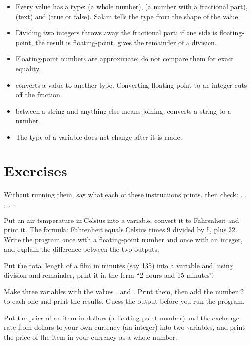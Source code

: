 \begin{summary}
\begin{itemize}
  \item Every value has a type:  (a whole number),  (a
        number with a fractional part),  (text) and 
        (true or false). Salam tells the type from the shape of the value.
  \item Dividing two integers throws away the fractional part; if one side
        is floating-point, the result is floating-point. \code{\%} gives
        the remainder of a division.
  \item Floating-point numbers are approximate; do not compare them for
        exact equality.
  \item {} converts a value to another type. Converting
        floating-point to an integer cuts off the fraction.
  \item \code{+} between a string and anything else means joining.
         converts a string to a number.
  \item The type of a variable does not change after it is made.
\end{itemize}
\end{summary}

\section*{Exercises}

\exercise Without running them, say what each of these instructions prints,
then check: , ,
, , .

\exercise Put an air temperature in Celsius into a variable, convert it to
Fahrenheit and print it. The formula: Fahrenheit equals Celsius times 9
divided by 5, plus 32. Write the program once with a floating-point number
and once with an integer, and explain the difference between the two
outputs.

\exercise Put the total length of a film in minutes (say 135) into a
variable and, using division and remainder, print it in the form ``2 hours
and 15 minutes''.

\exercise Make three variables with the values ,  and
. Print them, then add the number 2 to each one and print the
results. Guess the output before you run the program.

\exercise Put the price of an item in dollars (a floating-point number)
and the exchange rate from dollars to your own currency (an integer) into
two variables, and print the price of the item in your currency as a whole
number.
